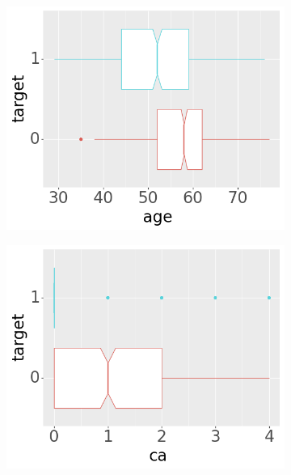 \begin{figure}[b]
     \centering
     \begin{subfigure}[b]{0.32\textwidth}
         \centering
         \includegraphics[width=\textwidth]{plots/target-age}
     \end{subfigure}
     \begin{subfigure}[b]{0.32\textwidth}
         \centering
         \includegraphics[width=\textwidth]{plots/target-ca}
     \end{subfigure}
     \begin{subfigure}[b]{0.32\textwidth}
         \centering

\end{subfigure}
\end{figure}

